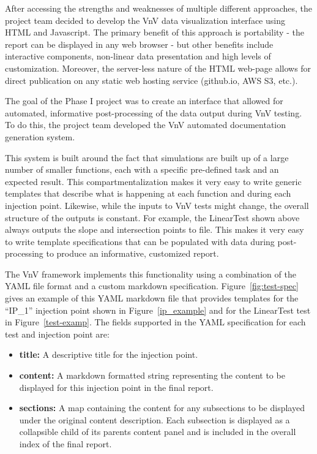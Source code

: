 After accessing the strengths and weaknesses of multiple different approaches, the project team decided to develop the VnV data visualization interface using HTML and Javascript. The primary benefit of this approach is portability - the report can be displayed in any web browser - but other benefits include interactive components, non-linear data presentation and high levels of customization. Moreover, the server-less nature of the HTML web-page allows for direct publication on any static web hosting service (github.io, AWS S3, etc.). 

The goal of the Phase I project was to create an interface that allowed for automated, informative post-processing of the data output during VnV testing. To do this, the project team developed the VnV automated documentation generation system. 

This system is built around the fact that simulations are built up of a large number of smaller functions, each with a specific pre-defined task and an expected result. This compartmentalization makes it very easy to write generic templates that describe what is happening at each function and during each injection point. Likewise, while the inputs to VnV tests might change, the overall structure of the outputs is constant. For example, the LinearTest shown above always outputs the slope and intersection points to file. This makes it very easy to write template specifications that can be populated with data during post-processing to produce an informative, customized report. 

The VnV framework implements this functionality using a combination of the YAML file format and a custom markdown specification. Figure~\ref{fig:test-spec} gives an example of this YAML
markdown file that provides templates for the ``IP\_1'' injection point shown in Figure~\ref{ip_example} and for the LinearTest test in Figure~\ref{test-examp}. The fields supported in the YAML specification for each test and injection point are:

\begin{itemize}
 \item {\bf title:} A descriptive title for the injection point.
 \item {\bf content:} A markdown formatted string representing the content to be displayed for this injection point in the final report.
 \item {\bf sections:} A map containing the content for any subsections to be displayed under the original content description. Each subsection is displayed  as a collapsible child of its parents content panel and is included in the overall index of the final report. 
 \end{itemize}

